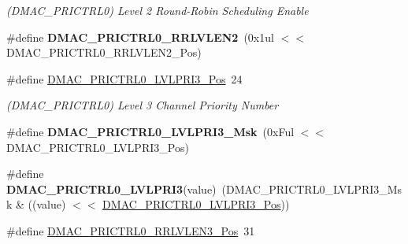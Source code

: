 \begin{DoxyCompactItemize}
\begin{DoxyCompactList}\small\item\em (D\+M\+A\+C\+\_\+\+P\+R\+I\+C\+T\+R\+L0) Level 2 Round-\/\+Robin Scheduling Enable \end{DoxyCompactList}\item 
\hypertarget{group___s_a_m_l21___d_m_a_c_ga04ccddd65ee786275d0fb5c466671e72}{}\#define {\bfseries D\+M\+A\+C\+\_\+\+P\+R\+I\+C\+T\+R\+L0\+\_\+\+R\+R\+L\+V\+L\+E\+N2}~(0x1ul $<$$<$ D\+M\+A\+C\+\_\+\+P\+R\+I\+C\+T\+R\+L0\+\_\+\+R\+R\+L\+V\+L\+E\+N2\+\_\+\+Pos)\label{group___s_a_m_l21___d_m_a_c_ga04ccddd65ee786275d0fb5c466671e72}

\item 
\hypertarget{group___s_a_m_l21___d_m_a_c_ga99a75f02e3365f3c161eb56cf1bc0393}{}\#define \hyperlink{group___s_a_m_l21___d_m_a_c_ga99a75f02e3365f3c161eb56cf1bc0393}{D\+M\+A\+C\+\_\+\+P\+R\+I\+C\+T\+R\+L0\+\_\+\+L\+V\+L\+P\+R\+I3\+\_\+\+Pos}~24\label{group___s_a_m_l21___d_m_a_c_ga99a75f02e3365f3c161eb56cf1bc0393}

\begin{DoxyCompactList}\small\item\em (D\+M\+A\+C\+\_\+\+P\+R\+I\+C\+T\+R\+L0) Level 3 Channel Priority Number \end{DoxyCompactList}\item 
\hypertarget{group___s_a_m_l21___d_m_a_c_ga211c4ad7c7b2140ad07a1ffa161bbf39}{}\#define {\bfseries D\+M\+A\+C\+\_\+\+P\+R\+I\+C\+T\+R\+L0\+\_\+\+L\+V\+L\+P\+R\+I3\+\_\+\+Msk}~(0x\+Ful $<$$<$ D\+M\+A\+C\+\_\+\+P\+R\+I\+C\+T\+R\+L0\+\_\+\+L\+V\+L\+P\+R\+I3\+\_\+\+Pos)\label{group___s_a_m_l21___d_m_a_c_ga211c4ad7c7b2140ad07a1ffa161bbf39}

\item 
\hypertarget{group___s_a_m_l21___d_m_a_c_ga29ed4517d9062967ad3363ad50af8c15}{}\#define {\bfseries D\+M\+A\+C\+\_\+\+P\+R\+I\+C\+T\+R\+L0\+\_\+\+L\+V\+L\+P\+R\+I3}(value)~(D\+M\+A\+C\+\_\+\+P\+R\+I\+C\+T\+R\+L0\+\_\+\+L\+V\+L\+P\+R\+I3\+\_\+\+Msk \& ((value) $<$$<$ \hyperlink{group___s_a_m_l21___d_m_a_c_ga99a75f02e3365f3c161eb56cf1bc0393}{D\+M\+A\+C\+\_\+\+P\+R\+I\+C\+T\+R\+L0\+\_\+\+L\+V\+L\+P\+R\+I3\+\_\+\+Pos}))\label{group___s_a_m_l21___d_m_a_c_ga29ed4517d9062967ad3363ad50af8c15}

\item 
\hypertarget{group___s_a_m_l21___d_m_a_c_gaf3ada4bf03e701bedbec0f9ea0b26548}{}\#define \hyperlink{group___s_a_m_l21___d_m_a_c_gaf3ada4bf03e701bedbec0f9ea0b26548}{D\+M\+A\+C\+\_\+\+P\+R\+I\+C\+T\+R\+L0\+\_\+\+R\+R\+L\+V\+L\+E\+N3\+\_\+\+Pos}~31\label{group___s_a_m_l21___d_m_a_c_gaf3ada4bf03e701bedbec0f9ea0b26548}


\end{DoxyCompactItemize}
